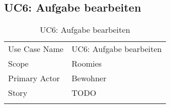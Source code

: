 \subsection{UC6: Aufgabe bearbeiten}
\begin{table}[H]
	\tablestyle
	\tablealtcolored
	\begin{tabularx}{\textwidth}{lX}
		\tablebody
			Use Case Name &
			UC6: Aufgabe bearbeiten
			\tabularnewline
			Scope &
			Roomies
			\tabularnewline
			Primary Actor &
			Bewohner
			\tabularnewline
			Story &
			TODO
			\tabularnewline
		\tableend
	\end{tabularx}
	\caption{UC6: Aufgabe bearbeiten}
\end{table}


